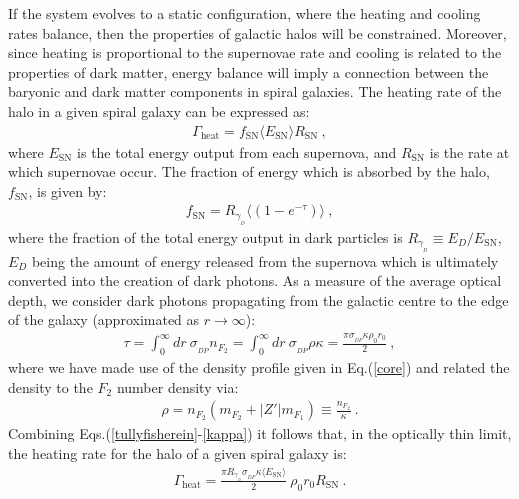 \documentclass[12pt]{article}
\begin{document}
{{If the system evolves to a static configuration, where the heating and
cooling rates  balance, then the properties of galactic halos will be
constrained. Moreover, since heating is proportional to the supernovae
rate and cooling is related to the properties of dark matter, energy
balance will imply a connection between the baryonic and dark matter
components in spiral galaxies. The heating rate of the halo in a given
spiral galaxy can be expressed as:
%
\begin{eqnarray}
\Gamma _{\text{heat}} = f _{\text{SN}}\langle E _{\text{SN}} \rangle R
_{\text{SN}} \ ,
\label{tullyfisherein}
\end{eqnarray}
%
where $E _{\text{SN}}$ is the total energy output from each supernova,
and $R _{\text{SN}}$ is the rate at which supernovae occur. The fraction
of energy which is absorbed by the halo, $f _{\text{SN}}$, is given by:
%
\begin{eqnarray}
f _{\text{SN}} = R _{\gamma _{_D}}\langle \left (1 - e ^{-\tau} \right
)\rangle \ ,
\label{fsn}
\end{eqnarray}
%
where the fraction of the total energy output in dark particles is $R
_{\gamma _{_D}} \equiv E _D/E _{\text{SN}}$, $E _D$ being the amount of
energy released from the supernova which is ultimately converted into
the creation of dark photons. As a measure of the average optical depth,
we consider dark photons propagating from the galactic centre to the
edge of the galaxy (approximated as $r \rightarrow \infty$):
%
\begin{eqnarray}
\tau = \int _0 ^{\infty} dr \ \sigma _{_{DP}}n _{F_2} = \int _0
^{\infty} dr \ \sigma _{_{DP}} \rho \kappa = \frac{\pi \sigma _{_{DP}}
\kappa \rho _0r _0}{2} \ ,
\label{opticaldepth}
\end{eqnarray}
%
where we have made use of the density profile given in Eq.(\ref{core})
and related the density to the $F _2$ number density via:
%
\begin{eqnarray}
\rho = n _{F_2}(m _{F_2} + |Z'|m _{F_1}) \equiv \frac{n _{F_2}}{\kappa}
\ .
\label{kappa}
\end{eqnarray}
%
Combining Eqs.(\ref{tullyfisherein}-\ref{kappa}) it follows that, in the
optically thin limit, the heating rate for the halo of a given spiral
galaxy is:
%
\begin{eqnarray}
\Gamma _{\text{heat}} = \frac{\pi R _{\gamma _{_D}}\sigma _{_{DP}}\kappa
\langle E _{\text{SN}} \rangle}{2} \ \rho _0r _0R _{\text{SN}} \ .
\label{tullyfisherein1}
\end{eqnarray}
%

}}
\end{document}
